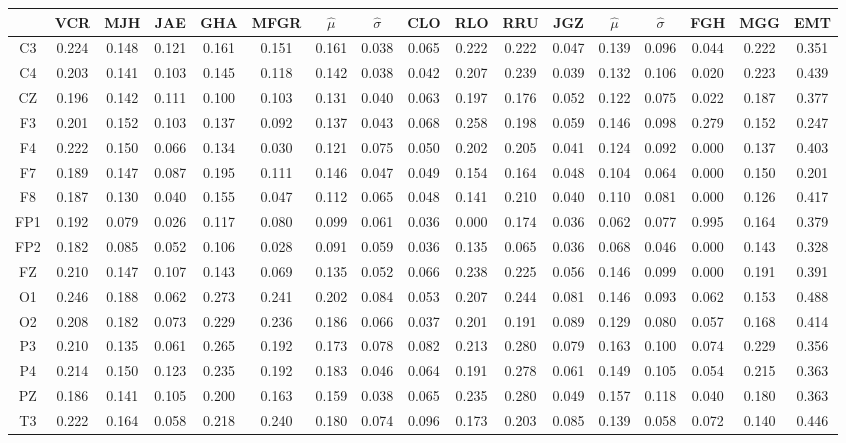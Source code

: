 \begin{SidewaysFigure}
\centering
\begin{tabular}{c||ccccc|cc||cccc|cc||ccc}
& VCR & MJH & JAE & GHA & MFGR &$\widehat{\mu}$ & $\widehat{\sigma}$
& CLO & RLO & RRU & JGZ &$\widehat{\mu}$ & $\widehat{\sigma}$
& FGH & MGG & EMT \\
\hline
C3&0.224&0.148&0.121&0.161&0.151&0.161&0.038&0.065&0.222&0.222&0.047&0.139&0.096&0.044&0.222&0.351 \\
C4&0.203&0.141&0.103&0.145&0.118&0.142&0.038&0.042&0.207&0.239&0.039&0.132&0.106&0.020&0.223&0.439 \\
CZ&0.196&0.142&0.111&0.100&0.103&0.131&0.040&0.063&0.197&0.176&0.052&0.122&0.075&0.022&0.187&0.377 \\
F3&0.201&0.152&0.103&0.137&0.092&0.137&0.043&0.068&0.258&0.198&0.059&0.146&0.098&0.279&0.152&0.247 \\
F4&0.222&0.150&0.066&0.134&0.030&0.121&0.075&0.050&0.202&0.205&0.041&0.124&0.092&0.000&0.137&0.403 \\
F7&0.189&0.147&0.087&0.195&0.111&0.146&0.047&0.049&0.154&0.164&0.048&0.104&0.064&0.000&0.150&0.201 \\
F8&0.187&0.130&0.040&0.155&0.047&0.112&0.065&0.048&0.141&0.210&0.040&0.110&0.081&0.000&0.126&0.417 \\
FP1&0.192&0.079&0.026&0.117&0.080&0.099&0.061&0.036&0.000&0.174&0.036&0.062&0.077&0.995&0.164&0.379 \\
FP2&0.182&0.085&0.052&0.106&0.028&0.091&0.059&0.036&0.135&0.065&0.036&0.068&0.046&0.000&0.143&0.328 \\
FZ&0.210&0.147&0.107&0.143&0.069&0.135&0.052&0.066&0.238&0.225&0.056&0.146&0.099&0.000&0.191&0.391 \\
O1&0.246&0.188&0.062&0.273&0.241&0.202&0.084&0.053&0.207&0.244&0.081&0.146&0.093&0.062&0.153&0.488 \\
O2&0.208&0.182&0.073&0.229&0.236&0.186&0.066&0.037&0.201&0.191&0.089&0.129&0.080&0.057&0.168&0.414 \\
P3&0.210&0.135&0.061&0.265&0.192&0.173&0.078&0.082&0.213&0.280&0.079&0.163&0.100&0.074&0.229&0.356 \\
P4&0.214&0.150&0.123&0.235&0.192&0.183&0.046&0.064&0.191&0.278&0.061&0.149&0.105&0.054&0.215&0.363 \\
PZ&0.186&0.141&0.105&0.200&0.163&0.159&0.038&0.065&0.235&0.280&0.049&0.157&0.118&0.040&0.180&0.363 \\
T3&0.222&0.164&0.058&0.218&0.240&0.180&0.074&0.096&0.173&0.203&0.085&0.139&0.058&0.072&0.140&0.446 \\

\end{tabular}
\end{SidewaysFigure}
